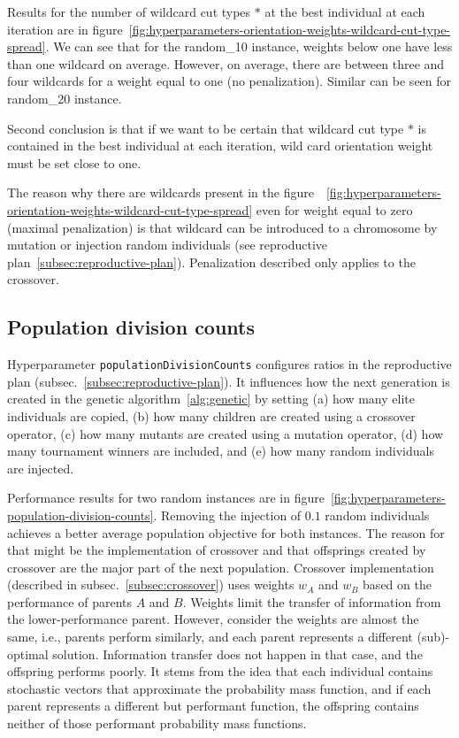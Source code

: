 Results for the number of wildcard cut types $*$ at the best individual at each iteration are in
figure~\ref{fig:hyperparameters-orientation-weights-wildcard-cut-type-spread}.
We can see that for the random\_10 instance, weights below one have less than one wildcard on average.
However, on average, there are between three and four wildcards for a weight equal to one (no penalization).
Similar can be seen for random\_20 instance.

Second conclusion is that if we want to be certain that wildcard cut type $*$ is contained in the best individual at each iteration,
wild card orientation weight must be set close to one.

The reason why there are wildcards present in the figure~~\ref{fig:hyperparameters-orientation-weights-wildcard-cut-type-spread}
even for weight equal to zero (maximal penalization) is that wildcard can be introduced to a chromosome by mutation
or injection random individuals (see reproductive plan~\ref{subsec:reproductive-plan}).
Penalization described only applies to the crossover.

\subsection{Population division counts}\label{subsec:population-division-counts}
Hyperparameter \verb|populationDivisionCounts| configures ratios in the reproductive plan (subsec.~\ref{subsec:reproductive-plan}).
It influences how the next generation is created in the genetic algorithm~\ref{alg:genetic}
by setting (a) how many elite individuals are copied, (b) how many children are created using a crossover operator,
(c) how many mutants are created using a mutation operator, (d) how many tournament winners are included,
and (e) how many random individuals are injected.

Performance results for two random instances are in figure~\ref{fig:hyperparameters-population-division-counts}.
Removing the injection of $0.1$ random individuals achieves a better average population objective for both instances.
The reason for that might be the implementation of crossover and that offsprings created by crossover
are the major part of the next population.
Crossover implementation (described in subsec.~\ref{subsec:crossover}) uses weights $w_A$ and $w_B$
based on the performance of parents $A$ and $B$.
Weights limit the transfer of information from the lower-performance parent.
However, consider the weights are almost the same, i.e., parents perform similarly, and each parent represents a different (sub)-optimal solution. Information transfer does not happen in that case, and the offspring performs poorly.
It stems from the idea that each individual contains stochastic vectors that approximate the probability mass
function, and if each parent represents a different but performant function, the offspring contains
neither of those performant probability mass functions.

